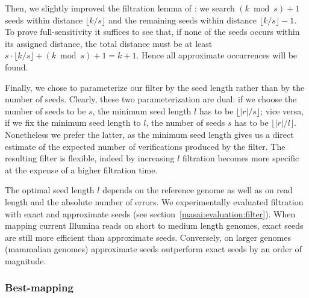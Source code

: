 Then, we slightly improved the filtration lemma of \citep{Navarro2000}:
we search $(k \bmod{s}) + 1$ seeds within distance $\lfloor k/s \rfloor$ and the remaining seeds within distance $\lfloor k/s \rfloor - 1$.
To prove full-sensitivity it suffices to see that, if none of the seeds occurs within its assigned distance, the total distance must be at least $s \cdot \lfloor k/s \rfloor + (k \bmod s) + 1 = k + 1$.
Hence all approximate occurrences will be found.

Finally, we chose to parameterize our filter by the seed length rather than by the number of seeds.
Clearly, these two parameterization are dual: if we choose the number of seeds to be $s$, the minimum seed length $l$ has to be $\lfloor |r|/s \rfloor$; vice versa, if we fix the minimum seed length to $l$, the number of seeds $s$ has to be $\lfloor |r|/l \rfloor$.
Nonetheless we prefer the latter, as the minimum seed length gives us a direct estimate of the expected number of verifications produced by the filter.
The resulting filter is flexible, indeed by increasing $l$ filtration becomes more specific at the expense of a higher filtration time.

The optimal seed length $l$ depends on the reference genome as well as on read length and the absolute number of errors.
We experimentally evaluated filtration with exact and approximate seeds (see section~\ref{masai:evaluation:filter}).
When mapping current Illumina reads on short to medium length genomes, exact seeds are still more efficient than approximate seeds.
Conversely, on larger genomes (\eg mammalian genomes) approximate seeds outperform exact seeds by an order of magnitude.

\subsubsection{Best-mapping}




